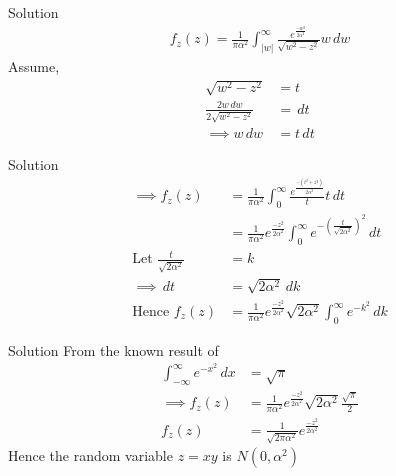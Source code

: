 \documentclass{beamer}
\theoremstyle{remark}
\numberwithin{equation}{subsection}
\begin{document}
\begin{frame}{Solution}
    \begin{align}
        f_z(z) = \frac{1}{\pi \alpha^2}\int_{|w|}^{\infty} \frac{e^{\frac{-w^2}{2\alpha^2}}}{\sqrt{w^2 - z^2}} w \,dw 
    \end{align}
    Assume, 
    \begin{align}
        \sqrt{w^2 - z^2} &= t \\
        \frac{2w \,dw}{2\sqrt{w^2 - z^2}} &= \, dt \\
        \implies w \, dw &= t\, dt
    \end{align}
\end{frame}

\begin{frame}{Solution}
    \begin{align}
       \implies f_z(z) &= \frac{1}{\pi \alpha^2} \int_{0}^{\infty} \frac{e^{\frac{-(t^2 + z^2)}{2\alpha^2}}}{t} t \, dt \\
       &= \frac{1}{\pi \alpha^2} e^{\frac{-z^2}{2\alpha^2}}\int_{0}^{\infty} e^{-(\frac{t}{\sqrt{2\alpha^2}})^2} \, dt \\
       \text{Let } \frac{t}{\sqrt{2\alpha^2}} &= k  \\
       \implies \, dt &= \sqrt{2\alpha^2} \, dk \\
       \text{Hence } f_z(z) &= \frac{1}{\pi \alpha^2} e^{\frac{-z^2}{2\alpha^2}}\sqrt{2\alpha^2} \int_{0}^{\infty} e^{-k^2} \, dk 
    \end{align}
\end{frame}

\begin{frame}{Solution}
    From the known result of 
    \begin{align}
        \int_{-\infty}^{\infty} e^{-x^2} \, dx &= \sqrt{\pi} \\
        \implies f_z(z) &= \frac{1}{\pi \alpha^2}e^{\frac{-z^2}{2\alpha^2}} \sqrt{2\alpha^2} \frac{\sqrt{\pi}}{2}  \\
       f_z(z) &= \frac{1}{\sqrt{2\pi\alpha^2}}e^{\frac{-z^2}{2\alpha^2}}
    \end{align}
    Hence the random variable $z = xy$ is $N(0,\alpha^2)$
\end{frame}
\end{document}
